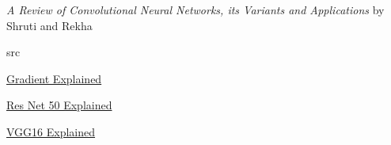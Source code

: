 \documentclass[a4paper,10pt]{article}
\begin{document}
\begin{thebibliography}{}
     \emph{A Review of Convolutional Neural Networks, its Variants and Applications} by Shruti and Rekha


     src

     \href{https://machinelearningmastery.com/gradient-in-machine-learning/}{Gradient Explained}

     \href{https://viso.ai/deep-learning/resnet-residual-neural-network/}{Res Net 50 Explained}

     \href{https://www.kaggle.com/code/blurredmachine/vggnet-16-architecture-a-complete-guide}{VGG16 Explained}    

  \end{thebibliography}
\end{document}
